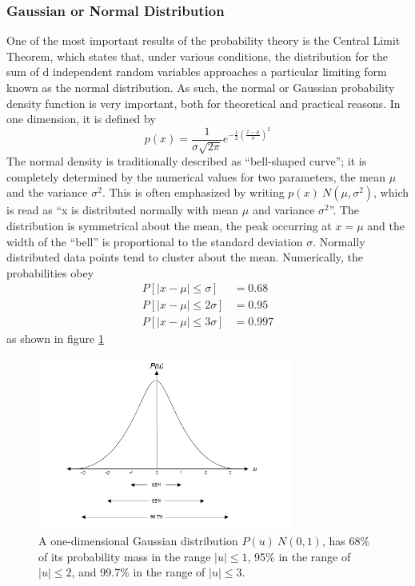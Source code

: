\documentclass[12pt, a4paper, twoside]{report}
\begin{document}
\subsubsection{Gaussian or Normal Distribution}
One of the most important results of the probability theory is the Central Limit Theorem, which states that, under various conditions, the distribution for the sum of d independent random variables approaches a particular limiting form known as the normal distribution. As such, the normal or Gaussian probability density function is very important, both for theoretical and practical reasons. In one dimension, it is defined by
\begin{equation}
p(x) = \frac{1}{\sigma \sqrt{2\pi }} e^{-\frac{1}{2}\left ( \frac{x-\mu }{\sigma } \right )^{2}}
\end{equation}
The normal density is traditionally described as ``bell-shaped curve''; it is completely determined by the numerical values for two parameters, the mean $\mu$ and the variance $\sigma^2$. This is often emphasized by writing $p(x)~N(\mu,\sigma^2)$, which is read as ``x is distributed normally with mean $\mu$ and variance $\sigma^2$''. The distribution is symmetrical about the mean, the peak occurring at $x=\mu$ and the width of the ``bell'' is proportional to the standard deviation $\sigma$. Normally distributed data points tend to cluster about the mean. Numerically, the probabilities obey
\begin{align}
P[|x-\mu| \leq \sigma] &= 0.68 \\ 
P[|x-\mu| \leq 2\sigma] &= 0.95 \\ 
P[|x-\mu| \leq 3\sigma] &= 0.997 \label{eq:gaussian-majority}
\end{align}
as shown in figure \ref{fig:gaussian}
\begin{figure}[ht]
	\centering
	\includegraphics[width=0.75\textwidth]
	{images/chapter2/gaussian}
	\caption{A one-dimensional Gaussian distribution $P(u)~N(0,1)$, has 68\% of its probability mass in the range $|u|\leq 1$, 95\% in the range of $|u|\leq 2$, and 99.7\% in the range of $|u|\leq 3$.}
	\label{fig:gaussian}
\end{figure}
\end{document}
